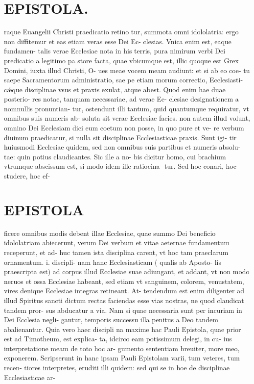 \documentclass{article}
\begin{document}
\begin{pages}
\section*{EPISTOLA. }\pstart raque Euangelii Christi praedicatio retino tur, summota omni idololatria: ergo non diffitemur et eas etiam veras esse Dei Ec- clesias. Vnica enim est, eaque fundamen- talis verae Ecclesiae nota in his terris, pura nimirum verbi Dei predicatio a legitimo pa store facta, quae vbicumque est, illic quoque est Grex Domini, iuxta illud Christi, O- ues meae vocem meam audiunt: et si ab eo coe- tu saepe Sacramentorum administratio, sae pe etiam morum correctio, Ecclesiasti- cǽque disciplinae vsus et praxis exulat, atque abest. Quod enim hae duae posterio- res notae, tanquam necessariae, ad verae Ec- clesiae designationem a nomnullis pronuntian- tur, ostendunt illi tantum, quid quantumque requiratur, vt omnibus suis numeris ab- soluta sit verae Ecclesiae facies. non autem illud volunt, omnino Dei Ecclesiam dici eum coetum non posse, in quo pure et ve- re verbum diuinum praedicatur, si nulla sit disciplinae Ecclesiasticae praxis. Sunt igi- tir huiusmodi Ecclesiae quidem, sed non omnibus suis partibus et numeris absolu- tae: quin potius claudicantes. Sic ille a no- bis dicitur homo, cui brachium vtrumque abscissum est, si modo idem ille ratiocina- tur. Sed hoc conari, hoc studere, hoc ef-  \pend
\section*{EPISTOLA }\pstart ficere omnibus modis debent illae Ecclesiae, quae summo Dei beneficio idololatriam abiecerunt, verum Dei verbum et vitae aeternae fundamentum receperunt, et ad- huc tamen ista disciplina carent, vt hoc tam praeclarum ornamentum. i. discipli- nam hanc Ecclesiasticam ( qualis ab Aposto- lis praescripta est) ad corpus illud Ecclesiae suae adiungant, et addant, vt non modo neruos et ossa Ecclesiae habeant, sed etiam vt sanguinem, colorem, venustatem, vires denique Ecclesiae integras retineant. At- tendendum est enim diligenter ad illud Spiritus sancti dictum rectas faciendas esse vias nostras, ne quod claudicat tandem pror- sus abducatur a via. Nam si quae necessaria sunt per incuriam in Dei Ecclesia negli- gantur, temporis successu illa penitus a Deo tandem abalienantur. Quia vero haec discipli na maxime hac Pauli Epistola, quae prior est ad Timotheum, est explica- ta, idcirco eam potissimum delegi, in cu- ius interpretatione meam de toto hoc ar- gumento sententiam breuiter, more meo, exponerem. Scripserunt in hanc ipsam Pauli Epistolam varii, tum veteres, tum recen- tiores interpretes, eruditi illi quidem: sed qui se in hoe de disciplinae Ecclesiasticae ar-  \pend

\end{pages}
\end{document}
